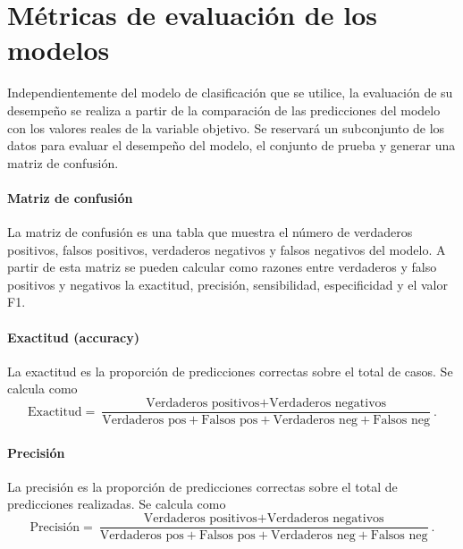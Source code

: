 \documentclass[a4paper]{report}
\begin{document}
\section{Métricas de evaluación de los modelos}

Independientemente del modelo de clasificación que se utilice, la evaluación de su desempeño se realiza a partir de la comparación de las predicciones del modelo con los valores reales de la variable objetivo.
Se reservará un subconjunto de los datos para evaluar el desempeño del modelo, el conjunto de prueba y generar una matriz de confusión.

\paragraph{Matriz de confusión}
La matriz de confusión es una tabla que muestra el número de verdaderos positivos, falsos positivos, verdaderos negativos y falsos negativos del modelo.
A partir de esta matriz se pueden calcular como razones entre verdaderos y falso positivos y negativos la exactitud, precisión, sensibilidad, especificidad y el valor F1.

\paragraph{Exactitud (accuracy)}
La exactitud es la proporción de predicciones correctas sobre el total de casos.
Se calcula como
\begin{equation}
	\text{Exactitud} = \frac{\text{Verdaderos positivos} + \text{Verdaderos negativos}}{\text{Verdaderos pos} + \text{Falsos pos} + \text{Verdaderos neg} + \text{Falsos neg}}.
\end{equation}

\paragraph{Precisión}
La precisión es la proporción de predicciones correctas sobre el total de predicciones realizadas.
Se calcula como
\begin{equation}
	\text{Precisión} = \frac{\text{Verdaderos positivos} + \text{Verdaderos negativos}}{\text{Verdaderos pos} + \text{Falsos pos} + \text{Verdaderos neg} + \text{Falsos neg}}.
\end{equation}
\end{document}
